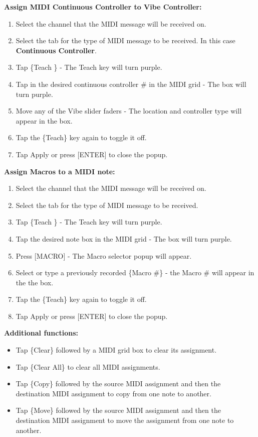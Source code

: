 \documentclass[
]{article}
\begin{document}
\textbf{Assign MIDI Continuous Controller to Vibe Controller:}

\begin{enumerate}
\def\labelenumi{\arabic{enumi}.}
\item
  Select the channel that the MIDI message will be received on.
\item
  Select the tab for the type of MIDI message to be received. In this case \textbf{Continuous Controller}.
\item
  Tap \{Teach \} - The Teach key will turn purple.
\item
  Tap in the desired continuous controller \# in the MIDI grid - The box will turn purple.
\item
  Move any of the Vibe slider faders - The location and controller type will appear in the box.
\item
  Tap the \{Teach\} key again to toggle it off.
\item
  Tap Apply or press {[}ENTER{]} to close the popup.
\end{enumerate}

\textbf{Assign Macros to a MIDI note:}

\begin{enumerate}
\def\labelenumi{\arabic{enumi}.}
\item
  Select the channel that the MIDI message will be received on.
\item
  Select the tab for the type of MIDI message to be received.
\item
  Tap \{Teach \} - The Teach key will turn purple.
\item
  Tap the desired note box in the MIDI grid - The box will turn purple.
\item
  Press {[}MACRO{]} - The Macro selector popup will appear.
\item
  Select or type a previously recorded \{Macro \#\} - the Macro \# will appear in the the box.
\item
  Tap the \{Teach\} key again to toggle it off.
\item
  Tap Apply or press {[}ENTER{]} to close the popup.
\end{enumerate}

\textbf{Additional functions:}

\begin{itemize}
\item
  Tap \{Clear\} followed by a MIDI grid box to clear its assignment.
\item
  Tap \{Clear All\} to clear all MIDI assignments.
\item
  Tap \{Copy\} followed by the source MIDI assignment and then the destination MIDI assignment to copy from one note to another.
\item
  Tap \{Move\} followed by the source MIDI assignment and then the destination MIDI assignment to move the assignment from one note to another.
\end{itemize}
\end{document}
